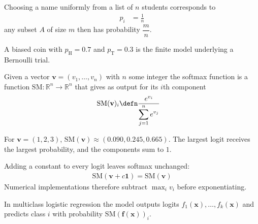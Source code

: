 \documentclass[a4paper, 12pt]{book}
\begin{document}
\begin{example}
    Choosing a name uniformly from a list of $n$ students corresponds to
    \begin{align}
        p_i &= \frac{1}{n}
    \end{align}
    any subset $A$ of size $m$ then has probability $\dfrac{m}{n}$.
\end{example}

\begin{example}
    A biased coin with $p_{\mathrm{H}}=0.7$ and $p_{\mathrm{T}}=0.3$ is the finite model underlying a Bernoulli trial.
\end{example}

\begin{definition}
    Given a vector $\mathbf{v} = (v_1, \ldots, v_n)$
with $n$ some integer the softmax function is a function $\mathrm{SM}: \mathbb{R}^n \longrightarrow \mathbb{R}^n$ that gives as output for its $i$th component
\begin{align}
    \mathrm{SM}(\mathbf{v})_i &\defn  \frac{e^{v_i}}{\displaystyle  \sum_{j=1}^n e^{v_j}}
\end{align}
\end{definition}

\begin{example}
    For $\mathbf{v}=(1,2,3)$, $\mathrm{SM}(\mathbf{v})\approx(0.090,0.245,0.665)$. The largest logit receives the largest probability, and the components sum to $1$.
\end{example}

\begin{example}
    Adding a constant to every logit leaves softmax unchanged: 
    \begin{align}
        \mathrm{SM}(\mathbf{v}+c\mathbf{1})=\mathrm{SM}(\mathbf{v})
    \end{align}
    Numerical implementations therefore subtract $\max_i v_i$ before exponentiating.
\end{example}

\begin{example}
    In multiclass logistic regression the model outputs logits $f_1(\mathbf{x}),\ldots,f_k(\mathbf{x})$ and predicts class $i$ with probability $\mathrm{SM}(\mathbf{f}(\mathbf{x}))_i$.
\end{example}
\end{document}
